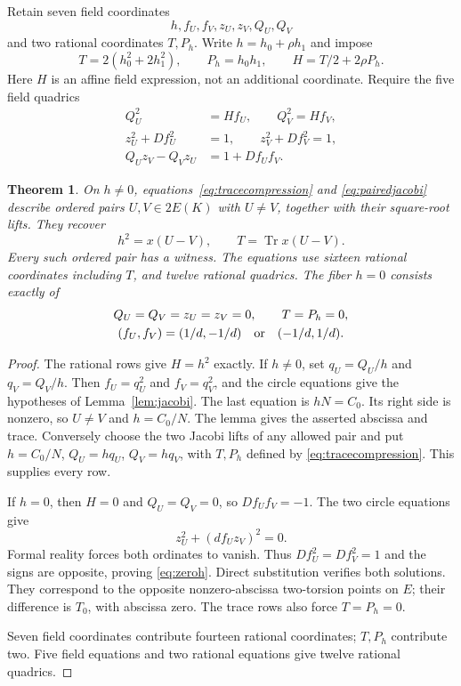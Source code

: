 \documentclass[11pt,a4paper]{article}
\newtheorem{theorem}{Theorem}[section]
\DeclareMathOperator{\Tr}{Tr}\DeclareMathOperator{\Nm}{Nm}
\begin{document}
Retain seven field coordinates
\[
                  h,f_U,f_V,z_U,z_V,Q_U,Q_V
\]
and two rational coordinates $T,P_h$. Write $h=h_0+\rho h_1$ and
impose
\begin{equation}\label{eq:tracecompression}
 T=2(h_0^2+2h_1^2),\qquad P_h=h_0h_1,
 \qquad H=T/2+2\rho P_h.
\end{equation}
Here $H$ is an affine field expression, not an additional coordinate.
Require the five field quadrics
\begin{equation}\label{eq:pairedjacobi}
 \begin{split}
 Q_U^2&=Hf_U,\qquad Q_V^2=Hf_V,\\
 z_U^2+Df_U^2&=1,\qquad z_V^2+Df_V^2=1,\\
 Q_Uz_V-Q_Vz_U&=1+Df_Uf_V.
 \end{split}
\end{equation}

\begin{theorem}\label{thm:paired}
On $h\ne0$, equations~\eqref{eq:tracecompression} and
\eqref{eq:pairedjacobi} describe ordered pairs
$U,V\in2E(K)$ with $U\ne V$, together with their square-root
lifts. They recover
\[
                     h^2=x(U-V),\qquad T=\Tr x(U-V).
\]
Every such ordered pair has a witness. The equations use sixteen
rational coordinates including $T$, and twelve rational quadrics.
The fiber $h=0$ consists exactly of
\begin{equation}\label{eq:zeroh}
 \begin{gathered}
 Q_U=Q_V=z_U=z_V=0,\qquad T=P_h=0,\\
 (f_U,f_V)=(1/d,-1/d)\quad\hbox{or}\quad(-1/d,1/d).
 \end{gathered}
\end{equation}
\end{theorem}
\begin{proof}
The rational rows give $H=h^2$ exactly. If $h\ne0$, set
$q_U=Q_U/h$ and $q_V=Q_V/h$. Then $f_U=q_U^2$ and
$f_V=q_V^2$, and the circle equations give the hypotheses of
Lemma~\ref{lem:jacobi}. The last equation is $hN=C_0$.
Its right side is nonzero, so $U\ne V$ and $h=C_0/N$.
The lemma gives the asserted abscissa and trace. Conversely choose
the two Jacobi lifts of any allowed pair and put $h=C_0/N$,
$Q_U=hq_U$, $Q_V=hq_V$, with $T,P_h$ defined by
\eqref{eq:tracecompression}. This supplies every row.

If $h=0$, then $H=0$ and $Q_U=Q_V=0$, so
$Df_Uf_V=-1$. The two circle equations give
\[
                    z_U^2+(df_Uz_V)^2=0.
\]
Formal reality forces both ordinates to vanish. Thus
$Df_U^2=Df_V^2=1$ and the signs are opposite, proving
\eqref{eq:zeroh}. Direct substitution verifies both solutions.
They correspond to the opposite nonzero-abscissa two-torsion
points on $E$; their difference is $T_0$, with abscissa zero.
The trace rows also force $T=P_h=0$.

Seven field coordinates contribute fourteen rational coordinates;
$T,P_h$ contribute two. Five field equations and two rational
equations give twelve rational quadrics.
\end{proof}
\end{document}
